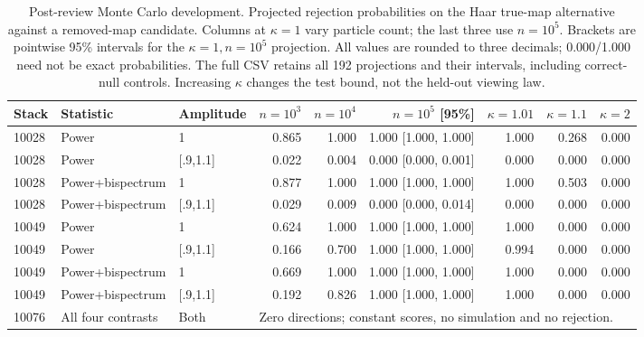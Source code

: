 \begin{table}[t]
\centering\footnotesize
\caption{Post-review Monte Carlo development. Projected rejection probabilities on the Haar true-map alternative against a removed-map candidate. Columns at $\kappa=1$ vary particle count; the last three use $n=10^5$. Brackets are pointwise 95\% intervals for the $\kappa=1,n=10^5$ projection. All values are rounded to three decimals; 0.000/1.000 need not be exact probabilities. The full CSV retains all 192 projections and their intervals, including correct-null controls. Increasing $\kappa$ changes the test bound, not the held-out viewing law.}
\label{tab:momentmc}
\begin{tabular}{lllrrrrrr}
\toprule
Stack & Statistic & Amplitude & $n=10^3$ & $n=10^4$ & $n=10^5$ [95\%] & $\kappa=1.01$ & $\kappa=1.1$ & $\kappa=2$ \\
\midrule
10028 & Power & 1 & 0.865 & 1.000 & 1.000 [1.000, 1.000] & 1.000 & 0.268 & 0.000 \\
10028 & Power & [.9,1.1] & 0.022 & 0.004 & 0.000 [0.000, 0.001] & 0.000 & 0.000 & 0.000 \\
10028 & Power+bispectrum & 1 & 0.877 & 1.000 & 1.000 [1.000, 1.000] & 1.000 & 0.503 & 0.000 \\
10028 & Power+bispectrum & [.9,1.1] & 0.029 & 0.009 & 0.000 [0.000, 0.014] & 0.000 & 0.000 & 0.000 \\
10049 & Power & 1 & 0.624 & 1.000 & 1.000 [1.000, 1.000] & 1.000 & 0.000 & 0.000 \\
10049 & Power & [.9,1.1] & 0.166 & 0.700 & 1.000 [1.000, 1.000] & 0.994 & 0.000 & 0.000 \\
10049 & Power+bispectrum & 1 & 0.669 & 1.000 & 1.000 [1.000, 1.000] & 1.000 & 0.000 & 0.000 \\
10049 & Power+bispectrum & [.9,1.1] & 0.192 & 0.826 & 1.000 [1.000, 1.000] & 1.000 & 0.000 & 0.000 \\
10076 & All four contrasts & Both & \multicolumn{6}{l}{Zero directions; constant scores, no simulation and no rejection.} \\
\bottomrule
\end{tabular}
\end{table}
